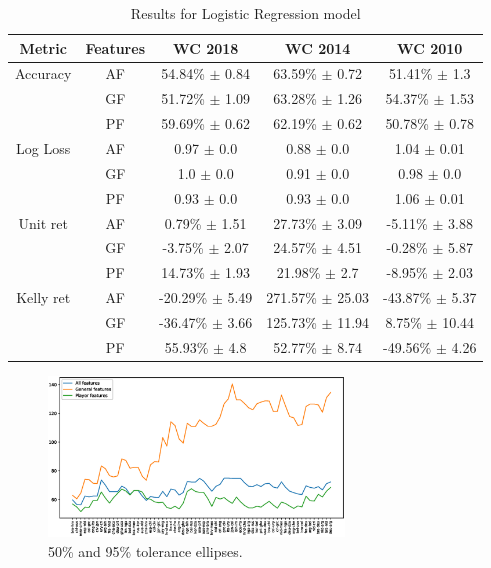 \begin{table}
    \caption{Results for Logistic Regression model}
    \begin{tabular}{| c  c| c| c| c|}
        \hline
        Metric&Features& \textbf{WC 2018} & \textbf{WC 2014} & \textbf{WC 2010}\\
        \hline
        Accuracy & AF & 54.84\% $\pm$ 0.84 & 63.59\% $\pm$ 0.72 & 51.41\% $\pm$ 1.3 \\
 & GF & 51.72\% $\pm$ 1.09 & 63.28\% $\pm$ 1.26 & 54.37\% $\pm$ 1.53 \\
 & PF & 59.69\% $\pm$ 0.62 & 62.19\% $\pm$ 0.62 & 50.78\% $\pm$ 0.78 \\
 \hline
Log Loss & AF & 0.97 $\pm$ 0.0 & 0.88 $\pm$ 0.0 & 1.04 $\pm$ 0.01 \\
 & GF & 1.0 $\pm$ 0.0 & 0.91 $\pm$ 0.0 & 0.98 $\pm$ 0.0 \\
 & PF & 0.93 $\pm$ 0.0 & 0.93 $\pm$ 0.0 & 1.06 $\pm$ 0.01 \\
 \hline
Unit ret & AF & 0.79\% $\pm$ 1.51 & 27.73\% $\pm$ 3.09 & -5.11\% $\pm$ 3.88 \\
 & GF & -3.75\% $\pm$ 2.07 & 24.57\% $\pm$ 4.51 & -0.28\% $\pm$ 5.87 \\
 & PF & 14.73\% $\pm$ 1.93 & 21.98\% $\pm$ 2.7 & -8.95\% $\pm$ 2.03 \\
 \hline
Kelly ret & AF & -20.29\% $\pm$ 5.49 & 271.57\% $\pm$ 25.03 & -43.87\% $\pm$ 5.37 \\
 & GF & -36.47\% $\pm$ 3.66 & 125.73\% $\pm$ 11.94 & 8.75\% $\pm$ 10.44 \\
 & PF & 55.93\% $\pm$ 4.8 & 52.77\% $\pm$ 8.74 & -49.56\% $\pm$ 4.26 \\
 \hline
    \end{tabular}
    \label{table:linearmodel}
\end{table}


\begin{figure}[H]
    \centering
    \includegraphics[width=0.7\textwidth]{img/match_level_score_2014_kelly.eps}
    \caption{50\% and 95\% tolerance ellipses.}
    \label{fig:50_95}
\end{figure}